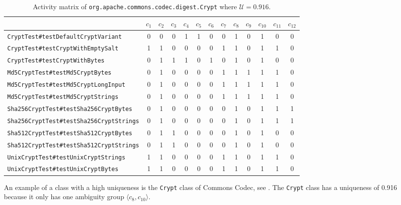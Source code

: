 \documentclass[twoside,a4paper,11pt]{memoir}
\begin{document}
\begin{table}[]
\scriptsize
\centering
\caption{Activity matrix of \texttt{org.apache.commons.codec.digest.Crypt} where \(\mathcal{U} = 0.916\).}%
\label{tab:crypt}
\begin{adjustbox}{center}
\begin{tabular}{l|cccccccccccc}
 & \(c_1 \) & \(c_2 \) & \(c_3 \) & \(c_4 \) & \(c_5 \) & \(c_6 \) & \(c_7 \) & \(c_8 \) & \(c_9 \) & \(c_{10} \) & \(c_{11} \) & \(c_{12} \) \\ \hline
\texttt{CryptTest\#testDefaultCryptVariant} & 0 & 0 & 0 & 1 & 1 & 0 & 0 & 1 & 0 & 1 & 0 & 0 \\
\texttt{CryptTest\#testCryptWithEmptySalt} & 1 & 1 & 0 & 0 & 0 & 0 & 1 & 1 & 0 & 1 & 1 & 0 \\
\texttt{CryptTest\#testCryptWithBytes} & 0 & 1 & 1 & 1 & 0 & 1 & 0 & 1 & 0 & 1 & 0 & 0 \\
\texttt{Md5CryptTest\#testMd5CryptBytes} & 0 & 1 & 0 & 0 & 0 & 0 & 1 & 1 & 1 & 1 & 1 & 0 \\
\texttt{Md5CryptTest\#testMd5CryptLongInput} & 0 & 1 & 0 & 0 & 0 & 0 & 1 & 1 & 1 & 1 & 1 & 0 \\
\texttt{Md5CryptTest\#testMd5CryptStrings} & 0 & 1 & 0 & 0 & 0 & 0 & 1 & 1 & 1 & 1 & 1 & 0 \\
\texttt{Sha256CryptTest\#testSha256CryptBytes} & 0 & 1 & 0 & 0 & 0 & 0 & 0 & 1 & 0 & 1 & 1 & 1 \\
\texttt{Sha256CryptTest\#testSha256CryptStrings} & 0 & 1 & 0 & 0 & 0 & 0 & 0 & 1 & 0 & 1 & 1 & 1 \\
\texttt{Sha512CryptTest\#testSha512CryptBytes} & 0 & 1 & 1 & 0 & 0 & 0 & 0 & 1 & 0 & 1 & 0 & 0 \\
\texttt{Sha512CryptTest\#testSha512CryptStrings} & 0 & 1 & 1 & 0 & 0 & 0 & 0 & 1 & 0 & 1 & 0 & 0 \\
\texttt{UnixCryptTest\#testUnixCryptStrings} & 1 & 1 & 0 & 0 & 0 & 0 & 1 & 1 & 0 & 1 & 1 & 0 \\
\texttt{UnixCryptTest\#testUnixCryptBytes} & 1 & 1 & 0 & 0 & 0 & 0 & 1 & 1 & 0 & 1 & 1 & 0
\end{tabular}
\end{adjustbox}
\end{table}

An example of a class with a high uniqueness is the \texttt{Crypt} class of Commons Codec, see .
The \texttt{Crypt} class has a uniqueness of 0.916 because it only has one ambiguity group \(\langle c_8, c_{10} \rangle \).
\end{document}
